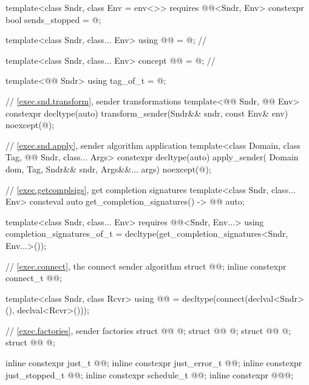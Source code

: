 \begin{codeblock}
{  template<class Sndr, class Env = env<>>
    requires @@<Sndr, Env>
    constexpr bool sends_stopped = @\seebelow@;

  template<class Sndr, class... Env>
    using @@ = @\seebelownc@;                 // \expos

  template<class Sndr, class... Env>
    concept @@ = @\seebelownc@;                          // \expos

  template<@@ Sndr>
    using tag_of_t = @\seebelow@;

  // \ref{exec.snd.transform}, sender transformations
  template<@@ Sndr, @@ Env>
    constexpr decltype(auto) transform_sender(Sndr&& sndr,
      const Env& env) noexcept(@\seebelow@);

  // \ref{exec.snd.apply}, sender algorithm application
  template<class Domain, class Tag, @@ Sndr, class... Args>
    constexpr decltype(auto) apply_sender(
      Domain dom, Tag, Sndr&& sndr, Args&&... args) noexcept(@\seebelow@);

  // \ref{exec.getcomplsigs}, get completion signatures
  template<class Sndr, class... Env>
    consteval auto get_completion_signatures() -> @@ auto;

  template<class Sndr, class... Env>
    requires @@<Sndr, Env...>
    using completion_signatures_of_t = decltype(get_completion_signatures<Sndr, Env...>());

  // \ref{exec.connect}, the connect sender algorithm
  struct @@;
  inline constexpr connect_t @@{};

  template<class Sndr, class Rcvr>
    using @@ =
      decltype(connect(declval<Sndr>(), declval<Rcvr>()));

  // \ref{exec.factories}, sender factories
  struct @@ { @\unspec@ };
  struct @@ { @\unspec@ };
  struct @@ { @\unspec@ };
  struct @@ { @\unspec@ };

  inline constexpr just_t @@{};
  inline constexpr just_error_t @@{};
  inline constexpr just_stopped_t @@{};
  inline constexpr schedule_t @@{};
  inline constexpr @\unspec@ @@{};

}
\end{codeblock}
